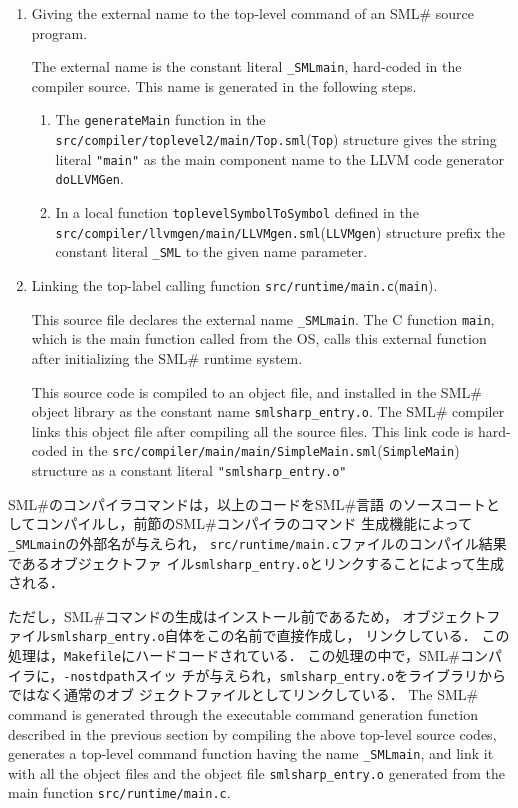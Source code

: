 \documentclass{jbook}
\newcommand{\smlsharp}{SML\#}
\newcommand{\code}[1]{\mbox{\large\tt #1}}
\newcommand{\module}[2]{\code{#1}(\code{#2})}
\begin{document}
\begin{enumerate}
\item Giving the external name to the top-level command of an
\smlsharp{} source program.

	The external name is the constant literal \code{\_SMLmain},
hard-coded in the compiler source.
	This name is generated in the following steps.
\begin{enumerate}
\item The \code{generateMain} function in the 
\module{src/compiler/toplevel2/main/Top.sml}{Top}
structure gives the string literal \code{"main"} as
the main component name to the LLVM code generator 
\code{doLLVMGen}.
\item 
	In a local function \code{toplevelSymbolToSymbol} defined
in the \module{src/compiler/llvmgen/main/LLVMgen.sml}{LLVMgen} structure
prefix the constant literal \code{\_SML} to the given name parameter.
\end{enumerate}

\item Linking the top-label calling function \module{src/runtime/main.c}{main}.

	This source file declares the external name \code{\_SMLmain}.
	The C function \code{main}, which is the main function called
from the OS, calls this external function after initializing 
the \smlsharp{} runtime system.

	This source code is compiled to an object file, 
and installed in the \smlsharp{} object library as the constant name
\code{smlsharp\_entry.o}.
	The \smlsharp{} compiler links this object file after compiling
all the source files.
	This link code is hard-coded in the
\module{src/compiler/main/main/SimpleMain.sml}{SimpleMain}
structure as a constant literal \code{"smlsharp\_entry.o"}
\end{enumerate}
\fi%

\ifjp%
	\smlsharp{}のコンパイラコマンドは，以上のコードを\smlsharp{}言語
のソースコートとしてコンパイルし，前節の\smlsharp{}コンパイラのコマンド
生成機能によって\code{\_SMLmain}の外部名が与えられ，
\code{src/runtime/main.c}ファイルのコンパイル結果であるオブジェクトファ
イル\code{smlsharp\_entry.o}とリンクすることによって生成される．

	ただし，\smlsharp{}コマンドの生成はインストール前であるため，
オブジェクトファイル\code{smlsharp\_entry.o}自体をこの名前で直接作成し，
リンクしている．
	この処理は，\code{Makefile}にハードコードされている．
	この処理の中で，\smlsharp{}コンパイラに，\code{-nostdpath}スイッ
チが与えられ，\code{smlsharp\_entry.o}をライブラリからではなく通常のオブ
ジェクトファイルとしてリンクしている．
\else%
	The \smlsharp{} command is generated through the 
executable command generation function described in the previous section
by compiling the above top-level source codes, generates a top-level
command function having the name \code{\_SMLmain}, and link it with all
the object files and the object file \code{smlsharp\_entry.o} generated 
from the main function \code{src/runtime/main.c}.
\end{document}
